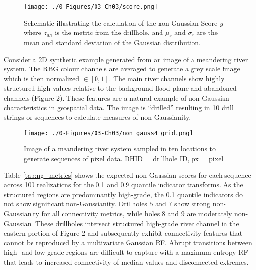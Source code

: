 \begin{figure}[htb!]
    \centering
    \texttt{[image: ./0-Figures/03-Ch03/score.png]}
    \caption{Schematic illustrating the calculation of the non-Gaussian Score $y$ where $z_{dh}$ is the metric from the drillhole, and $\mu_{r}$ and $\sigma_{r}$ are the mean and standard deviation of the Gaussian distribution.}
    \label{fig:score}
\end{figure}

Consider a \gls{2D} synthetic example generated from an image of a meandering river system. The \gls{RBG} colour channels are averaged to generate a grey scale image which is then normalized $\in [0,1]$. The main river channels show highly structured high values relative to the background flood plane and abandoned channels (Figure \ref{fig:non_gauss4_grid}). These features are a natural example of non-Gaussian characteristics in geospatial data. The image is ``drilled'' resulting in 10 drill strings or sequences to calculate measures of non-Gaussianity.

\begin{figure}[htb!]
    \centering
    \texttt{[image: ./0-Figures/03-Ch03/non\_gauss4\_grid.png]}
    \caption{Image of a meandering river system sampled in ten locations to generate sequences of pixel data. DHID = drillhole ID, px = pixel. }
    \label{fig:non_gauss4_grid}
\end{figure}

Table \ref{tab:ng_metrics} shows the expected non-Gaussian scores for each sequence across 100 realizations for the 0.1 and 0.9 quantile indicator transforms. As the structured regions are predominantly high-grade, the 0.1 quantile indicators do not show significant non-Gaussianity. Drillholes 5 and 7 show strong non-Gaussianity for all connectivity metrics, while holes 8 and 9 are moderately non-Gaussian. These drillholes intersect structured high-grade river channel in the eastern portion of Figure \ref{fig:non_gauss4_grid} and subsequently exhibit connectivity features that cannot be reproduced by a multivariate Gaussian \gls{RF}. Abrupt transitions between high- and low-grade regions are difficult to capture with a maximum entropy \gls{RF} that leads to increased connectivity of median values and disconnected extremes.

\begin{table}[!htb]
    \centering
    \caption{Non-Gaussian metrics calculated for 10 drillholes considering the 0.1 and 0.9 quantile indicator transforms. $y$-scores $\geq 2.5$ are considered strongly non-Gaussian. DHID corresponds to Figure \ref{fig:non_gauss4_grid}.}
    \resizebox{1\width}{!}{}
    \label{tab:ng_metrics}
\end{table}

